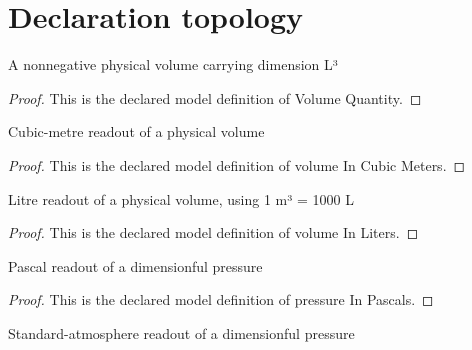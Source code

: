 \section{Declaration topology}
\begin{definition}
  \label{def:physics:phyx-mini-0491:phyxminiproblems-problemphyxmini0491-volumequantity}
  A nonnegative physical volume carrying dimension L³
\end{definition}
\begin{proof}
  This is the declared model definition of Volume Quantity.
\end{proof}
\begin{definition}
  \label{def:physics:phyx-mini-0491:phyxminiproblems-problemphyxmini0491-volumeincubicmeters}
  Cubic-metre readout of a physical volume
\end{definition}
\begin{proof}
  This is the declared model definition of volume In Cubic Meters.
\end{proof}
\begin{definition}
  \label{def:physics:phyx-mini-0491:phyxminiproblems-problemphyxmini0491-volumeinliters}
  Litre readout of a physical volume, using 1 m³ = 1000 L
\end{definition}
\begin{proof}
  This is the declared model definition of volume In Liters.
\end{proof}
\begin{definition}
  \label{def:physics:phyx-mini-0491:phyxminiproblems-problemphyxmini0491-pressureinpascals}
  Pascal readout of a dimensionful pressure
\end{definition}
\begin{proof}
  This is the declared model definition of pressure In Pascals.
\end{proof}
\begin{definition}
  \label{def:physics:phyx-mini-0491:phyxminiproblems-problemphyxmini0491-pressureinatmospheres}
  Standard-atmosphere readout of a dimensionful pressure
\end{definition}
